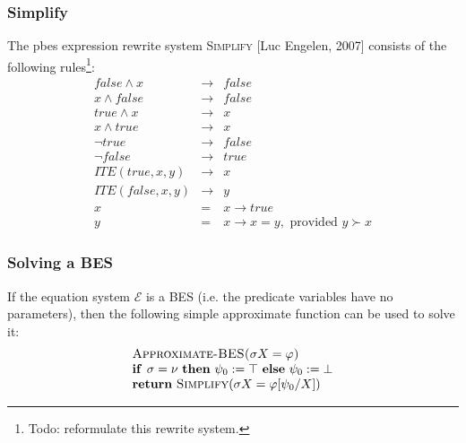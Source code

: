 \documentclass{article}
\begin{document}
\subsubsection{Simplify}

The pbes expression rewrite system \textsc{Simplify} [Luc Engelen, 2007]
consists of the following rules\footnote{%
Todo: reformulate this rewrite system.}:%
\begin{eqnarray*}
false\wedge x &\rightarrow &false \\
x\wedge false &\rightarrow &false \\
true\wedge x &\rightarrow &x \\
x\wedge true &\rightarrow &x \\
\lnot true &\rightarrow &false \\
\lnot false &\rightarrow &true \\
ITE(true,x,y) &\rightarrow &x \\
ITE(false,x,y) &\rightarrow &y \\
x &=&x\rightarrow true \\
y &=&x\rightarrow x=y,\text{ provided }y\succ x
\end{eqnarray*}

\subsubsection{Solving a BES}

If the equation system $\mathcal{E}$ is a BES (i.e. the predicate variables
have no parameters), then the following simple approximate function can be
used to solve it:%
\begin{equation*}
\begin{array}{l}
\text{\textsc{Approximate-BES(}}\sigma X=\varphi \text{\textsc{)}} \\
\text{\textbf{if }}\sigma =\nu \text{ \textbf{then} }\psi _{0}:=\top \text{
\textbf{else} }\psi _{0}:=\bot \\
\text{\textbf{return} \textsc{Simplify}(}\sigma X=\varphi \lbrack \psi
_{0}/X]\text{)}%
\end{array}%
\end{equation*}

\newpage

\appendix
\end{document}
